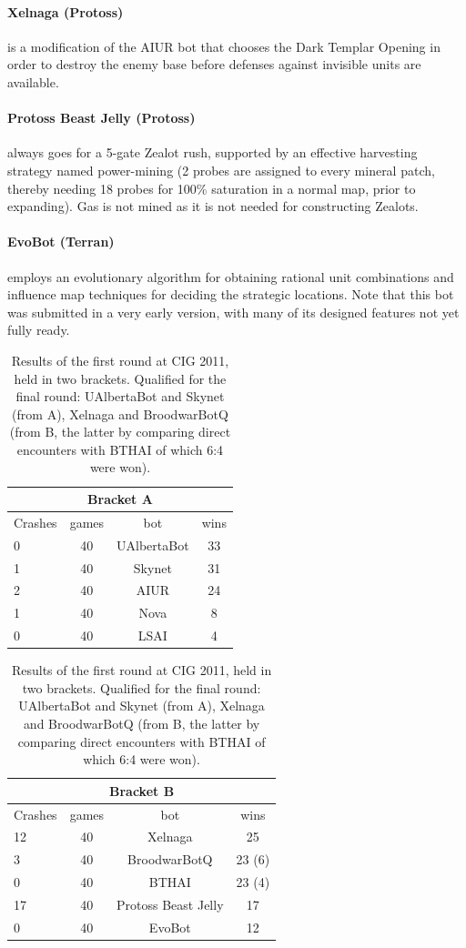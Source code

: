\documentclass[journal]{IEEEtran}
\begin{document}
\paragraph*{Xelnaga (Protoss)} is a modification of the AIUR bot that chooses the 
Dark Templar Opening in order to destroy the enemy base before defenses against
invisible units are available. 

\paragraph*{Protoss Beast Jelly (Protoss)}
always goes for a 5-gate Zealot rush, supported by an effective harvesting 
strategy named power-mining (2 probes are assigned to every mineral patch,
thereby needing 18 probes for 100\% saturation in a normal map, prior
to expanding). Gas is not mined as it is not needed for constructing Zealots.

\paragraph*{EvoBot (Terran)} employs an evolutionary algorithm for obtaining rational
 unit combinations and influence map techniques for deciding the strategic locations. Note
 that this bot was submitted in a very early version, with many of its designed features not
 yet fully ready. 


\begin{table}[htb]
\caption{Results of the first round at CIG 2011, held in two brackets.
Qualified for the final round: UAlbertaBot and Skynet (from A), Xelnaga
and BroodwarBotQ (from B, the latter by comparing direct encounters
with BTHAI of which 6:4 were won).}
\label{tab:cig-first-round}
\begin{small}
\begin{center}
\begin{tabular}{|l|c|c|c|}
\hline
\multicolumn{4}{|c|}{Bracket A} \\ \hline
Crashes & games & bot	& wins\\ \hline
0 &	 40 &	 UAlbertaBot &	 33\\
1 &   40 &	 Skynet	  &  31\\
2 &	 40 &	 AIUR	  &  24\\
1 &	 40 &	 Nova	  &  8\\
0 &	 40 &	 LSAI	  &  4\\
\hline
\end{tabular}
\begin{tabular}{|l|c|c|c|}
\hline
\multicolumn{4}{|c|}{Bracket B} \\ \hline
Crashes & games & bot	& wins\\ \hline
12 &	 40 &	 Xelnaga &	 25\\
3 &   40 &	 BroodwarBotQ  &  23 (6)\\
0 &	 40 &	 BTHAI	  &  23 (4)\\
17 &	 40 &	 Protoss Beast Jelly  & 17\\
0 &	 40 &	 EvoBot	  &  12\\
\hline
\end{tabular}
\end{center}
\end{small}
\end{table}
\end{document}

